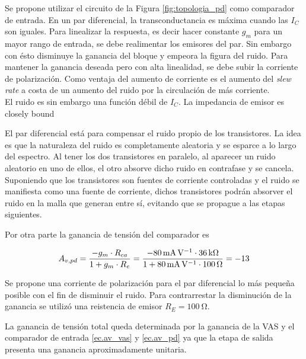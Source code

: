 

	Se propone utilizar el circuito de la Figura \ref{fig:topologia_pd} como comparador de entrada. En un par diferencial, la transconductancia es máxima cuando las $I_C$ son iguales. Para linealizar la respuesta, es decir hacer constante $g_m$ para un mayor rango de entrada, se debe realimentar los emisores del par. Sin embargo con ésto disminuye la ganancia del bloque y empeora la figura del ruido. Para mantener la ganancia deseada pero con alta linealidad, se debe subir la corriente de polarización. Como ventaja del aumento de corriente es el aumento del \emph{slew rate} a costa de un aumento del ruido por la circulación de más corriente.\\

	El ruido es sin embargo una función débil de $I_C$. La impedancia de emisor es closely bound

	El par diferencial está para compensar el ruido propio de los transistores. La idea es que la naturaleza del ruido es completamente aleatoria y se esparce a lo largo del espectro. Al tener los dos transistores en paralelo, al aparecer un ruido aleatorio en uno de ellos, el otro absorve dicho ruido en contrafase y se cancela. \\

	Suponiendo que los transistores son fuentes de corriente controladas y el ruido se manifiesta como una fuente de corriente, dichos transistores podrán absorver el ruido en la malla que generan entre sí, evitando que se propague a las etapas siguientes.


Por otra parte la ganancia de tensión del comparador es

\begin{equation}
	\centering
	A_{v,pd} = \frac{-g_m \cdot R_{ca}}{1+g_m \cdot R_e} = \frac{\SI{-80}{\mA\per\V} \cdot \SI{36}{\kilo\ohm} }{ 1 + \SI{80}{\mA\per\V} \cdot \SI{100}{\ohm} } = -13
	\label{ec.av_pd}
\end{equation}

Se propone una corriente de polarización para el par diferencial lo más pequeña posible con el fin de disminuir el ruido. Para contrarrestar la disminución de la ganancia se utilizó una reistencia de emisor $R_E=\SI{100}{\ohm}$.


La ganancia de tensión total queda determinada por la ganancia de la VAS y el comparador de entrada \eqref{ec.av_vas} y \eqref{ec.av_pd} ya que la etapa de salida presenta una ganancia aproximadamente unitaria.

